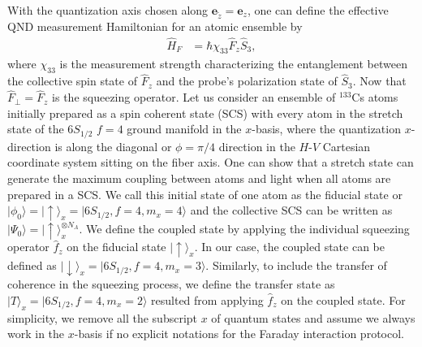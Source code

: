 \documentclass[preprint,aps,pra,onecolumn,superscriptaddress]{revtex4-1} %
\def\ket#1{\lvert{#1}\rangle}%
\begin{document}
With the quantization axis chosen along $ \mathbf{e}_{\tilde{z}}=\mathbf{e}_z $, one can define the effective QND measurement Hamiltonian for an atomic ensemble by
\begin{align}
\hat{H}_F &= \hbar \chi_{33}\hat{F}_z \hat{S}_3,
\end{align}
where $ \chi_{33} $ is the measurement strength characterizing the entanglement between the collective spin state of $ \hat{F}_z $ and the probe's polarization state of $ \hat{S}_3 $.
Now that $ \hat{F}_\perp=\hat{F}_z $ is the squeezing operator. 
Let us consider an ensemble of $ ^{133} $Cs atoms initially prepared as a spin coherent state (SCS) with every atom in the stretch state of the $ 6S_{1/2}$ $f=4 $ ground manifold in the $ x $-basis, where the quantization $ x $-direction is along the diagonal or $ \phi=\pi/4 $ direction in the $ H $-$ V $ Cartesian coordinate system sitting on the fiber axis.
One can show that a stretch state can generate the maximum coupling between atoms and light when all atoms are prepared in a SCS.
We call this initial state of one atom as the fiducial state or $ \ket{\phi_0}=\ket{\uparrow}_x = \ket{6S_{1/2},f=4,m_x=4} $ and the collective SCS can be written as $ \ket{\Psi_0}=\ket{\uparrow}_x^{\otimes N_A} $.
We define the coupled state by applying the individual squeezing operator $ \hat{f}_z$ on the fiducial state $\ket{\uparrow}_x $.
In our case, the coupled state can be defined as $ \ket{\downarrow}_x=\ket{6S_{1/2},f=4,m_x=3} $.
Similarly, to include the transfer of coherence in the squeezing process, we define the transfer state as $ \ket{T}_x=\ket{6S_{1/2},f=4,m_x=2} $ resulted from applying $ \hat{f}_z$ on the coupled state. 
For simplicity, we remove all the subscript $ x $ of quantum states and assume we always work in the $ x $-basis if no explicit notations for the Faraday interaction protocol. 
\end{document}
